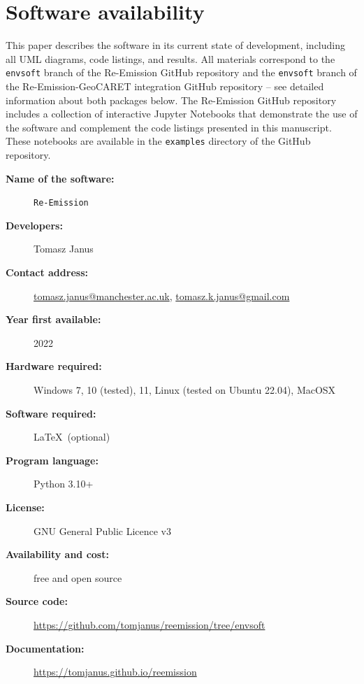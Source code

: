 \documentclass[review, authoryear, 1p]{elsarticle} %
\begin{document}
\section{Software availability}
\label{sec:software_availability}
This paper describes the software in its current state of development, including all UML diagrams, code listings, and results.
All materials correspond to the \texttt{envsoft} branch of the Re-Emission GitHub repository and the \texttt{envsoft} branch of the Re-Emission-GeoCARET integration GitHub repository -- see detailed information about both packages below.
The Re-Emission GitHub repository includes a collection of interactive Jupyter Notebooks that demonstrate the use of the software and complement the code listings presented in this manuscript.
These notebooks are available in the \texttt{examples} directory of the GitHub repository.

\begin{description}
  \item[\textbf{Name of the software:}] \texttt{Re-Emission}
  \item[\textbf{Developers:}] Tomasz Janus
  \item[\textbf{Contact address:}] \href{mailto:tomasz.janus@manchester.ac.uk}{tomasz.janus@manchester.ac.uk}, \href{mailto:tomasz.k.janus@gmail.com}{tomasz.k.janus@gmail.com}
  \item[\textbf{Year first available:}] 2022
  \item[\textbf{Hardware required:}] Windows 7, 10 (tested), 11, Linux (tested on Ubuntu 22.04), MacOSX
  \item[\textbf{Software required:}] \LaTeX \, (optional)
  \item[\textbf{Program language:}] Python 3.10+
  \item[\textbf{License:}] GNU General Public Licence v3
  \item[\textbf{Availability and cost:}] free and open source
  \item[\textbf{Source code:}] \href{https://github.com/tomjanus/reemission/tree/envsoft}{https://github.com/tomjanus/reemission/tree/envsoft} %
  \item[\textbf{Documentation:}] \href{https://tomjanus.github.io/reemission}{https://tomjanus.github.io/reemission}
\end{description}
\end{document}
